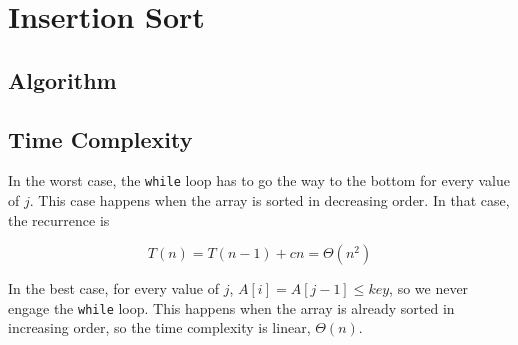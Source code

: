 \section{Insertion Sort}

\subsection{Algorithm}



\subsection{Time Complexity}

In the worst case, the \verb|while| loop has to go the way to the bottom for every value of $j$.  This case happens when the array is sorted in decreasing order.  In that case, the recurrence is

$$T(n) = T(n-1) + cn = \Theta(n^2)$$

In the best case, for every value of $j$, $A[i] = A[j-1] \le key$, so we never engage the \verb|while| loop.  This happens when the array is already sorted in increasing order, so the time complexity is linear, $\Theta (n)$.  

